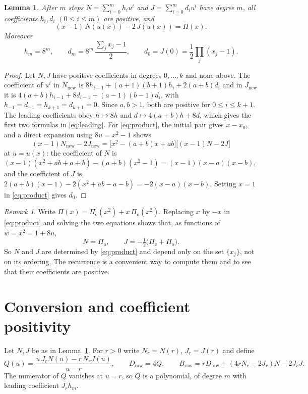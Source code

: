 \documentclass[11pt]{article}
\theoremstyle{plain}
\newtheorem{lemma}[theorem]{Lemma}
\theoremstyle{definition}
\theoremstyle{remark}
\newtheorem{remark}[theorem]{Remark}
\numberwithin{equation}{section}
\newcommand{\raw}{\mathrm{raw}}
\begin{document}
\begin{lemma}\label{lem:recurrence}
After \(m\) steps \(N=\sum_{i=0}^m h_iu^i\) and \(J=\sum_{i=0}^m d_iu^i\) have degree \(m\),
all coefficients \(h_i,d_i\) \((0\le i\le m)\) are positive, and
\begin{equation}\label{eq:product}
 (x-1)\,N(u(x))-2\,J(u(x))=\Pi(x).
\end{equation}
Moreover
\begin{equation}\label{eq:leading}
 h_m=8^m,\qquad d_m=8^m\,\frac{\sum_jx_j-1}{2},\qquad d_0=J(0)=\frac12\prod_{j}(x_j-1).
\end{equation}
\end{lemma}
\begin{proof}
Let \(N,J\) have positive coefficients in degrees \(0,\dots,k\) and none above. The
coefficient of \(u^i\) in \(N_{\mathrm{new}}\) is \(8h_{i-1}+(a+1)(b+1)h_i+2(a+b)d_i\) and in
\(J_{\mathrm{new}}\) it is \(4(a+b)h_{i-1}+8d_{i-1}+(a-1)(b-1)d_i\), with \(h_{-1}=d_{-1}=
h_{k+1}=d_{k+1}=0\). Since \(a,b>1\), both are positive for \(0\le i\le k+1\). The leading
coefficients obey \(h\mapsto8h\) and \(d\mapsto4(a+b)h+8d\), which gives the first two
formulas in \eqref{eq:leading}. For \eqref{eq:product}, the initial pair gives \(x-x_0\), and a
direct expansion using \(8u=x^2-1\) shows
\[
 (x-1)N_{\mathrm{new}}-2J_{\mathrm{new}}
 =\bigl[x^2-(a+b)x+ab\bigr]\bigl[(x-1)N-2J\bigr]
\]
at \(u=u(x)\): the coefficient of \(N\) is \((x-1)(x^2+ab+a+b)-(a+b)(x^2-1)=(x-1)(x-a)(x-b)\),
and the coefficient of \(J\) is \(2(a+b)(x-1)-2(x^2+ab-a-b)=-2(x-a)(x-b)\). Setting \(x=1\) in
\eqref{eq:product} gives \(d_0\).
\end{proof}

\begin{remark}\label{rem:evenodd}
Write \(\Pi(x)=\Pi_{\mathrm e}(x^2)+x\,\Pi_{\mathrm o}(x^2)\). Replacing \(x\) by \(-x\) in
\eqref{eq:product} and solving the two equations shows that, as functions of \(w=x^2=1+8u\),
\begin{equation}\label{eq:evenodd}
 N=\Pi_{\mathrm o},\qquad J=-\tfrac12\bigl(\Pi_{\mathrm e}+\Pi_{\mathrm o}\bigr).
\end{equation}
So \(N\) and \(J\) are determined by \eqref{eq:product} and depend only on the set
\(\{x_j\}\), not on its ordering. The recurrence is a convenient way to compute them and to
see that their coefficients are positive.
\end{remark}

\section{Conversion and coefficient positivity}\label{sec:conversion}
Let \(N,J\) be as in Lemma~\ref{lem:recurrence}. For \(r>0\) write \(N_r=N(r)\), \(J_r=J(r)\)
and define
\begin{equation}\label{eq:conversion}
 Q(u)=\frac{u\,J_rN(u)-r\,N_rJ(u)}{u-r},\qquad
 D_{\raw}=4Q,\qquad
 B_{\raw}=rD_{\raw}+(4rN_r-2J_r)N-2J_rJ .
\end{equation}
The numerator of \(Q\) vanishes at \(u=r\), so \(Q\) is a polynomial, of degree \(m\) with
leading coefficient \(J_rh_m\).
\end{document}

